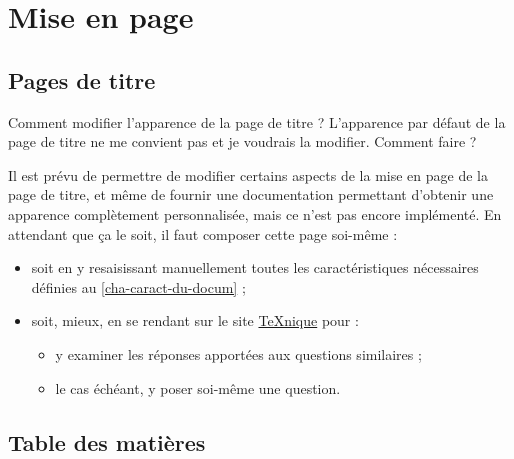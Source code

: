 

\section{Mise en page}
\label{sec-mise-en-page}

\subsection{Pages de titre}
\label{sec-pages-de-titre}
%
%

\begin{dbfaq}{Comment modifier l'apparence de la page de titre ?}{}
  L'apparence par défaut de la page de titre ne me convient pas et je voudrais
  la modifier. Comment faire ?
\end{dbfaq}

Il est prévu de permettre de modifier certains aspects de la mise en page de la
page de titre, et même de fournir une documentation permettant d'obtenir une
apparence complètement personnalisée, mais ce n'est pas encore implémenté.  En
attendant que ça le soit, il faut composer cette page soi-même :
\begin{itemize}
\item soit en y resaisissant manuellement toutes les caractéristiques
  nécessaires définies au \vref{cha-caract-du-docum} ;
\item soit, mieux, en se rendant sur le site
  \href{https://texnique.fr/osqa/tags/yathesis/}{\TeX{}nique} pour :
  \begin{itemize}
  \item y examiner les réponses apportées aux questions similaires ;
  \item le cas échéant, y poser soi-même une question.
  \end{itemize}
\end{itemize}

\subsection{Table des matières}
\label{sec-table-des-matieres-faq}

